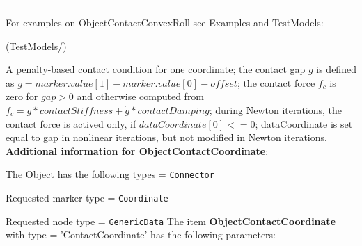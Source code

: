 \vspace{6pt}\par\noindent\rule{\textwidth}{0.4pt}
%
\noindent For examples on ObjectContactConvexRoll see Examples and TestModels:
\bi
\item {} (TestModels/)
\ei

%
\newpage

\label{sec:item:ObjectContactCoordinate}
A penalty-based contact condition for one coordinate; the contact gap $g$ is defined as $g=marker.value[1]- marker.value[0] - offset$; the contact force $f_c$ is zero for $gap>0$ and otherwise computed from $f_c = g*contactStiffness + \dot g*contactDamping$; during Newton iterations, the contact force is actived only, if $dataCoordinate[0] <= 0$; dataCoordinate is set equal to gap in nonlinear iterations, but not modified in Newton iterations.\vspace{12pt}
 \\{\bf Additional information for ObjectContactCoordinate}:
\bi
  \item The Object has the following types = \texttt{Connector}
  \item Requested marker type = \texttt{Coordinate}
  \item Requested node type = \texttt{GenericData}
\ei
\vspace{12pt} \noindent The item {\bf ObjectContactCoordinate} with type = 'ContactCoordinate' has the following parameters:\vspace{-1cm}\\ 
